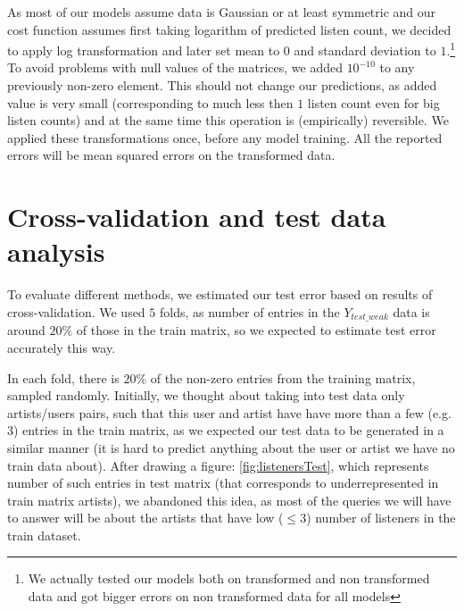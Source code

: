 \documentclass{report}
\begin{document}
As most of our models assume data is Gaussian or at least symmetric and our cost function assumes first taking logarithm of predicted listen count, we decided to apply log transformation and later set mean to $0$ and standard deviation to $1$.\footnote{We actually tested our models both on transformed and non transformed data and got bigger errors on non transformed data for all models} To avoid problems with null values of the matrices, we added $10^{-10}$ to any previously non-zero element. This should not change our predictions, as added value is very small (corresponding to much less then $1$ listen count even for big listen counts) and at the same time this operation is (empirically) reversible. We applied these transformations once, before any model training. All the reported errors will be mean squared errors on the transformed data.
\section{Cross-validation and test data analysis}
To evaluate different methods, we estimated our test error based on results of cross-validation. We used $5$ folds, as number of entries in the $Y_{test\_weak}$ data is around $20\%$ of those in the train matrix, so we expected to estimate test error accurately this way.

In each fold, there is $20\%$ of the non-zero entries from the training matrix, sampled randomly. Initially, we thought about taking into test data only artists/users pairs, such that this user and artist have have more than a few (e.g. $3$) entries in the train matrix, as we expected our test data to be generated in a similar manner (it is hard to predict anything about the user or artist we have no train data about). After drawing a figure: \ref{fig:listenersTest}, which represents number of such entries in test matrix (that corresponds to underrepresented in train matrix artists), we abandoned this idea, as most of the queries we will have to answer will be about the artists that have low ($\le 3$) number of listeners in the train dataset.
\end{document}
